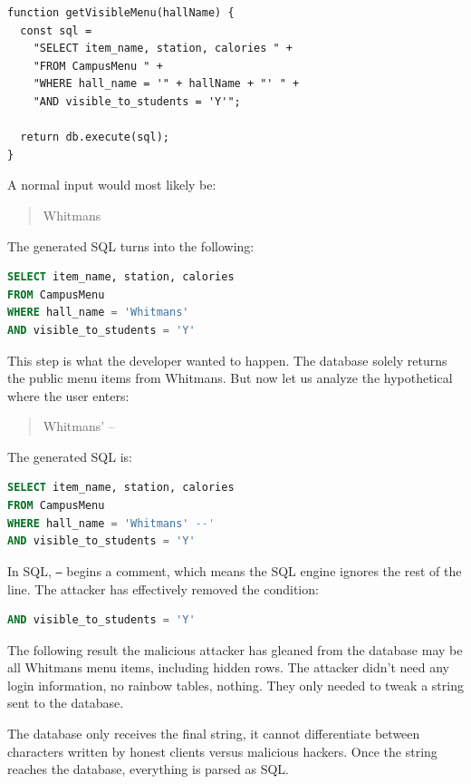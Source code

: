 \documentclass[12pt]{article}
\begin{document}
\begin{lstlisting}
function getVisibleMenu(hallName) {
  const sql =
    "SELECT item_name, station, calories " +
    "FROM CampusMenu " +
    "WHERE hall_name = '" + hallName + "' " +
    "AND visible_to_students = 'Y'";

  return db.execute(sql);
}
\end{lstlisting}

A normal input would most likely be:

\begin{quote}
Whitmans
\end{quote}

The generated SQL turns into the following:

\begin{lstlisting}[language=SQL]
SELECT item_name, station, calories
FROM CampusMenu
WHERE hall_name = 'Whitmans'
AND visible_to_students = 'Y'
\end{lstlisting}

This step is what the developer wanted to happen. The database solely returns the public menu items from Whitmans. But now let us analyze the hypothetical where the user enters:

\begin{quote}
Whitmans' --
\end{quote}

The generated SQL is:

\begin{lstlisting}[language=SQL]
SELECT item_name, station, calories
FROM CampusMenu
WHERE hall_name = 'Whitmans' --'
AND visible_to_students = 'Y'
\end{lstlisting}

In SQL, \texttt{--} begins a comment, which means the SQL engine ignores the rest of the line. The attacker has effectively removed the condition:

\begin{lstlisting}[language=SQL]
AND visible_to_students = 'Y'
\end{lstlisting}

The following result the malicious attacker has gleaned from the database may be all Whitmans menu items, including hidden rows. The attacker didn’t need any login information, no rainbow tables, nothing. They only needed to tweak a string sent to the database.


The database only receives the final string, it cannot differentiate between characters written by honest clients versus malicious hackers. Once the string reaches the database, everything is parsed as SQL.
\end{document}
